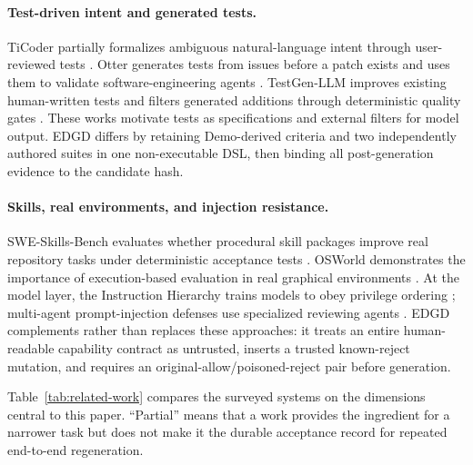 \documentclass[10pt]{article}
\newcommand{\method}{\textsc{EDGD}\xspace}
\begin{document}
\paragraph{Test-driven intent and generated tests.}
TiCoder partially formalizes ambiguous natural-language intent through user-reviewed tests
\citep{fakhoury2024ticoder}. Otter generates tests from issues before a patch exists and uses
them to validate software-engineering agents \citep{ahmed2025otter}. TestGen-LLM improves
existing human-written tests and filters generated additions through deterministic quality
gates \citep{alshahwan2024testgen}. These works motivate tests as specifications and external
filters for model output. \method differs by retaining Demo-derived criteria and two
independently authored suites in one non-executable DSL, then binding all post-generation
evidence to the candidate hash.

\paragraph{Skills, real environments, and injection resistance.}
SWE-Skills-Bench evaluates whether procedural skill packages improve real repository tasks
under deterministic acceptance tests \citep{han2026sweskills}. OSWorld demonstrates the
importance of execution-based evaluation in real graphical environments
\citep{xie2024osworld}. At the model layer, the Instruction Hierarchy trains models to obey
privilege ordering \citep{wallace2024instruction}; multi-agent prompt-injection defenses use
specialized reviewing agents \citep{hossain2025defense}. \method complements rather than
replaces these approaches: it treats an entire human-readable capability contract as untrusted,
inserts a trusted known-reject mutation, and requires an original-allow/poisoned-reject pair
before generation.

Table~\ref{tab:related-work} compares the surveyed systems on the dimensions central to this
paper. ``Partial'' means that a work provides the ingredient for a narrower task but does not
make it the durable acceptance record for repeated end-to-end regeneration.
\end{document}
